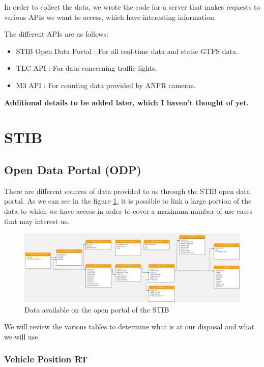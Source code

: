 \documentclass[12pt]{report}
\begin{document}
	In order to collect the data, we wrote the code for a server that makes requests to various APIs we want to access, which have interesting information.
	
	The different APIs are as follows:
	
	\begin{itemize}[noitemsep]
		\item STIB Open Data Portal : For all real-time data and static GTFS data.
		\item TLC API : For data concerning traffic lights.
		\item M3 API : For counting data provided by ANPR cameras.
	\end{itemize} 
	
	\textbf{Additional details to be added later, which I haven't thought of yet.} 
	
	
	\section{STIB}
	
	\subsection{Open Data Portal (ODP)}
	
	
	There are different sources of data provided to us through the STIB open data portal. As we can see in the figure \ref{STIB ODP}, it is possible to link a large portion of the data to which we have access in order to cover a maximum number of use cases that may interest us.
	
	
	\begin{figure}
		\centering
		\includegraphics[angle=90,origin=c,scale=0.7]{images/tables GTFS.png}
		\caption{Data available on the open portal of the STIB}
		\label{STIB ODP}
	\end{figure}
	
	We will review the various tables to determine what is at our disposal and what we will use.
	
	\subsubsection{Vehicle Position RT}
	
\end{document}
